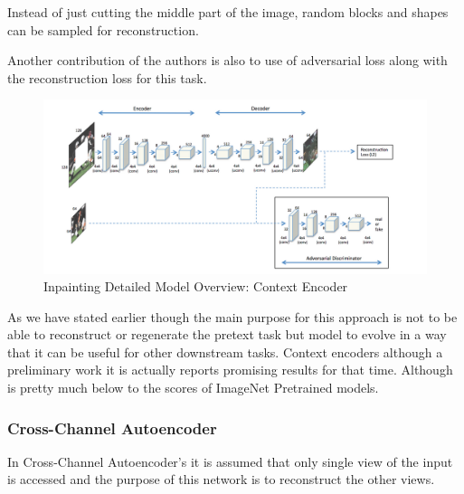 \documentclass{article}
\begin{document}
 
Instead of just cutting the middle part of the image,
random blocks and shapes can be sampled for reconstruction.
 
Another contribution of the authors is also to use of adversarial loss
along with the reconstruction loss for this task.
 
\begin{figure}[H]
   \centering
   \includegraphics[width=0.8\linewidth]{figures/inpainting_detailed_overview_model.png}
   \caption{ Inpainting Detailed Model Overview: Context Encoder}
   \end{figure}   
 
As we have stated earlier though the main purpose for this approach is not to
be able to reconstruct or regenerate the pretext task but model to evolve
in a way that it can be useful for other downstream tasks.
Context encoders although a preliminary work it is actually reports
promising results for that time. Although is pretty much below to the
scores of ImageNet Pretrained models.
 
 
\subsubsection{Cross-Channel Autoencoder}
 
In Cross-Channel Autoencoder's \cite{DBLP:journals/corr/ZhangIE16a}
it is assumed that only single view of the input is accessed
and the purpose of this network is to reconstruct the other views.
 
\end{document}
